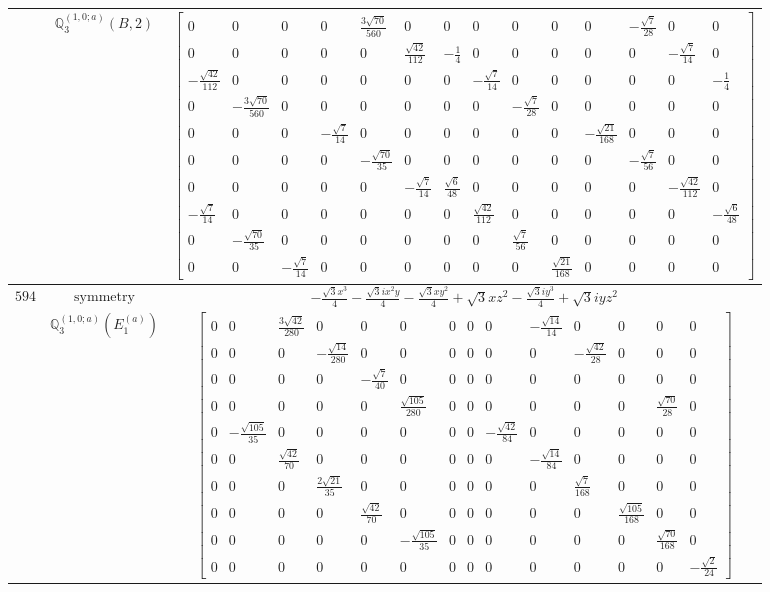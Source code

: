 \documentclass[fleqn,8pt,landscape]{jsarticle}
\begin{document}
\begin{longtable}{ccc}
$  $ & $ \mathbb{Q}_{3}^{(1,0;a)}(B,2) $ & $ \begin{bmatrix} 0 & 0 & 0 & 0 & \frac{3 \sqrt{70}}{560} & 0 & 0 & 0 & 0 & 0 & 0 & - \frac{\sqrt{7}}{28} & 0 & 0 \\ 0 & 0 & 0 & 0 & 0 & \frac{\sqrt{42}}{112} & - \frac{1}{4} & 0 & 0 & 0 & 0 & 0 & - \frac{\sqrt{7}}{14} & 0 \\ - \frac{\sqrt{42}}{112} & 0 & 0 & 0 & 0 & 0 & 0 & - \frac{\sqrt{7}}{14} & 0 & 0 & 0 & 0 & 0 & - \frac{1}{4} \\ 0 & - \frac{3 \sqrt{70}}{560} & 0 & 0 & 0 & 0 & 0 & 0 & - \frac{\sqrt{7}}{28} & 0 & 0 & 0 & 0 & 0 \\ 0 & 0 & 0 & - \frac{\sqrt{7}}{14} & 0 & 0 & 0 & 0 & 0 & 0 & - \frac{\sqrt{21}}{168} & 0 & 0 & 0 \\ 0 & 0 & 0 & 0 & - \frac{\sqrt{70}}{35} & 0 & 0 & 0 & 0 & 0 & 0 & - \frac{\sqrt{7}}{56} & 0 & 0 \\ 0 & 0 & 0 & 0 & 0 & - \frac{\sqrt{7}}{14} & \frac{\sqrt{6}}{48} & 0 & 0 & 0 & 0 & 0 & - \frac{\sqrt{42}}{112} & 0 \\ - \frac{\sqrt{7}}{14} & 0 & 0 & 0 & 0 & 0 & 0 & \frac{\sqrt{42}}{112} & 0 & 0 & 0 & 0 & 0 & - \frac{\sqrt{6}}{48} \\ 0 & - \frac{\sqrt{70}}{35} & 0 & 0 & 0 & 0 & 0 & 0 & \frac{\sqrt{7}}{56} & 0 & 0 & 0 & 0 & 0 \\ 0 & 0 & - \frac{\sqrt{7}}{14} & 0 & 0 & 0 & 0 & 0 & 0 & \frac{\sqrt{21}}{168} & 0 & 0 & 0 & 0 \end{bmatrix} $ \\ \hline
$ 594 $ & $ \text{symmetry} $ & $ - \frac{\sqrt{3} x^{3}}{4} - \frac{\sqrt{3} i x^{2} y}{4} - \frac{\sqrt{3} x y^{2}}{4} + \sqrt{3} x z^{2} - \frac{\sqrt{3} i y^{3}}{4} + \sqrt{3} i y z^{2} $ \\
$  $ & $ \mathbb{Q}_{3}^{(1,0;a)}(E_{1}^{(a)}) $ & $ \begin{bmatrix} 0 & 0 & \frac{3 \sqrt{42}}{280} & 0 & 0 & 0 & 0 & 0 & 0 & - \frac{\sqrt{14}}{14} & 0 & 0 & 0 & 0 \\ 0 & 0 & 0 & - \frac{\sqrt{14}}{280} & 0 & 0 & 0 & 0 & 0 & 0 & - \frac{\sqrt{42}}{28} & 0 & 0 & 0 \\ 0 & 0 & 0 & 0 & - \frac{\sqrt{7}}{40} & 0 & 0 & 0 & 0 & 0 & 0 & 0 & 0 & 0 \\ 0 & 0 & 0 & 0 & 0 & \frac{\sqrt{105}}{280} & 0 & 0 & 0 & 0 & 0 & 0 & \frac{\sqrt{70}}{28} & 0 \\ 0 & - \frac{\sqrt{105}}{35} & 0 & 0 & 0 & 0 & 0 & 0 & - \frac{\sqrt{42}}{84} & 0 & 0 & 0 & 0 & 0 \\ 0 & 0 & \frac{\sqrt{42}}{70} & 0 & 0 & 0 & 0 & 0 & 0 & - \frac{\sqrt{14}}{84} & 0 & 0 & 0 & 0 \\ 0 & 0 & 0 & \frac{2 \sqrt{21}}{35} & 0 & 0 & 0 & 0 & 0 & 0 & \frac{\sqrt{7}}{168} & 0 & 0 & 0 \\ 0 & 0 & 0 & 0 & \frac{\sqrt{42}}{70} & 0 & 0 & 0 & 0 & 0 & 0 & \frac{\sqrt{105}}{168} & 0 & 0 \\ 0 & 0 & 0 & 0 & 0 & - \frac{\sqrt{105}}{35} & 0 & 0 & 0 & 0 & 0 & 0 & \frac{\sqrt{70}}{168} & 0 \\ 0 & 0 & 0 & 0 & 0 & 0 & 0 & 0 & 0 & 0 & 0 & 0 & 0 & - \frac{\sqrt{2}}{24} \end{bmatrix} $ \\ \hline

\end{longtable}
\end{document}
